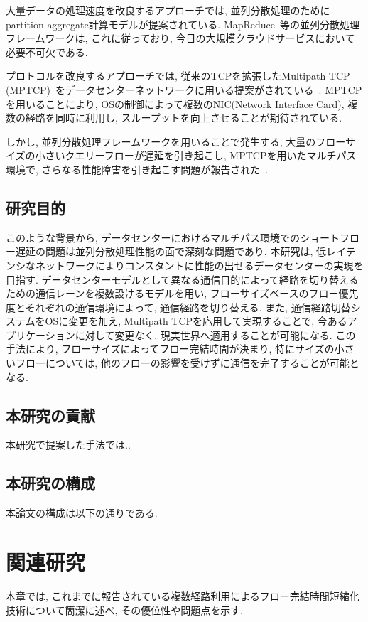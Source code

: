 \documentclass[11pt, a4paper, uplatex]{jsarticle}
\begin{document}
大量データの処理速度を改良するアプローチでは,
並列分散処理のためにpartition-aggregate計算モデルが提案されている.
MapReduce~\cite{mapreduce}等の並列分散処理フレームワークは,
これに従っており, 今日の大規模クラウドサービスにおいて必要不可欠である.

プロトコルを改良するアプローチでは,
従来のTCPを拡張したMultipath TCP
(MPTCP)~\cite{mptcp}をデータセンターネットワークに用いる提案がされている~\cite{fattree}.
MPTCPを用いることにより, OSの制御によって複数のNIC(Network Interface Card), 複数の経路を同時に利用し,
スループットを向上させることが期待されている.

しかし, 並列分散処理フレームワークを用いることで発生する, 大量のフローサイズの小さいクエリーフローが遅延を引き起こし,
MPTCPを用いたマルチパス環境で, さらなる性能障害を引き起こす問題が報告された~\cite{improving, rtt}.
\subsection{研究目的}
このような背景から,
データセンターにおけるマルチパス環境でのショートフロー遅延の問題は並列分散処理性能の面で深刻な問題であり,
本研究は, 低レイテンシなネットワークによりコンスタントに性能の出せるデータセンターの実現を目指す.
データセンターモデルとして異なる通信目的によって経路を切り替えるための通信レーンを複数設けるモデルを用い,
フローサイズベースのフロー優先度とそれぞれの通信環境によって, 通信経路を切り替える.
また, 通信経路切替システムをOSに変更を加え, Multipath TCPを応用して実現することで, 今あるアプリケーションに対して変更なく,
現実世界へ適用することが可能になる. 
この手法により, フローサイズによってフロー完結時間が決まり, 特にサイズの小さいフローについては, 他のフローの影響を受けずに通信を完了することが可能となる. 


\subsection{本研究の貢献}
本研究で提案した手法では..


\subsection{本研究の構成}
本論文の構成は以下の通りである. 


\section{関連研究}
本章では, これまでに報告されている複数経路利用によるフロー完結時間短縮化技術について簡潔に述べ, その優位性や問題点を示す.
\end{document}
